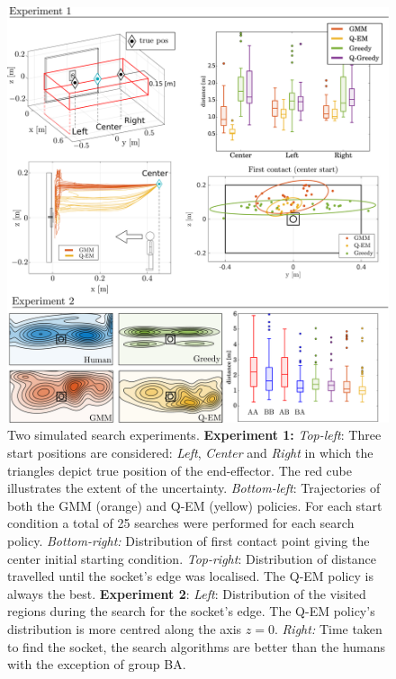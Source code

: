 \documentclass[final,3p,times,twocolumn]{elsarticle}
\begin{document}
\begin{figure}
    \centering
    \includegraphics[width=\linewidth]{./Figure/experiment1.pdf}
    \caption{Two simulated search experiments. \textbf{Experiment 1:} \textit{Top-left}: 
     Three start positions are considered: \textit{Left}, \textit{Center} and \textit{Right} in which the triangles depict true position of the end-effector. 
     The red cube illustrates the extent of the uncertainty. \textit{Bottom-left}: Trajectories of both the GMM (orange) and Q-EM (yellow) policies. 
     For each start condition a total of 25 searches were performed for each search policy.
     \textit{Bottom-right:} Distribution of first contact point giving the center initial starting condition. \textit{Top-right}: Distribution of distance 
     travelled until the socket's edge was localised. The Q-EM policy is always the best.
     \textbf{Experiment 2}: \textit{Left}: Distribution of the visited regions during the search for the socket's edge. The Q-EM policy's distribution 
     is more centred along the axis $z=0$. \textit{Right:} Time taken to find the socket, the search algorithms are better than the humans with the exception 
     of group BA.} 
    \label{fig:experiment12}
\end{figure}
\end{document}
